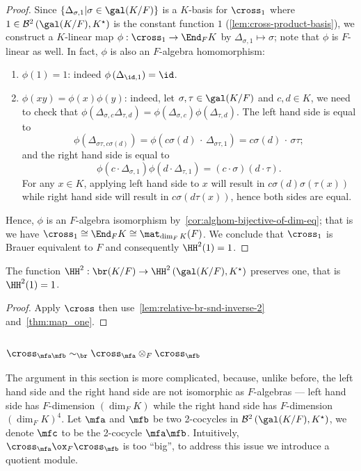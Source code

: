 \begin{proof}
  Since $\{\Delta_{\sigma, 1}|\sigma\in\gal(K/F)\}$ is a $K$-basis for $\cross_{1}$ where $1 \in \mathcal{B}^{2}\left(\gal(K/F),K^{\star}\right)$ is the constant function $1$ (\cref{lem:cross-product-basis}), we construct a $K$-linear map $\phi : \cross_{1} \to \End_{F} K$ by $\Delta_{\sigma, 1} \mapsto \sigma$; note that $\phi$ is $F$-linear as well. In fact, $\phi$ is also an $F$-algebra homomorphism:
  \begin{enumerate}
    \item $\phi(1) = 1$: indeed $\phi\left(\Delta_{\id,1}\right) = \id$.
    \item $\phi(xy) = \phi(x)\phi(y)$: indeed, let $\sigma,\tau\in\gal(K/F)$ and $c,d\in K$, we need to check that $\phi\left(\Delta_{\sigma,c}\Delta_{\tau,d}\right) = \phi\left(\Delta_{\sigma,c}\right)\phi\left(\Delta_{\tau,d}\right)$. The left hand side is equal to
          \[\phi\left(\Delta_{\sigma\tau,c\sigma(d)}\right) = \phi\left(c\sigma(d)\,\cdot\, \Delta_{\sigma\tau,1}\right) = c\sigma(d)\,\cdot\, \sigma\tau;\]
          and the right hand side is equal to
          \[
        \phi\left(c\cdot \Delta_{\sigma,1}\right)\phi\left(d\cdot \Delta_{\tau, 1}\right) = (c \cdot \sigma) (d \cdot \tau).
          \]
          For any $x \in K$, applying left hand side to $x$ will result in $c\sigma(d)\sigma(\tau(x))$ while right hand side will result in $c\sigma(d\tau(x))$, hence both sides are equal.
  \end{enumerate}
  Hence, $\phi$ is an $F$-algebra isomorphism by~\cref{cor:alghom-bijective-of-dim-eq}; that is we have $\cross_{1} \cong \End_{F}K \cong\mat_{\dim_{F}K}(F)$. We conclude that $\cross_{1}$ is Brauer equivalent to $F$ and consequently $\HH^{2}(1) = 1$.
\end{proof}


\begin{corollary}
  The function $\HH^{2}:\br(K/F) \to \HH^{2}\left(\gal(K/F), K^{\star}\right)$ preserves one, that is $\HH^{2}(1) = 1$.
  \leanok
\end{corollary}
\begin{proof}
  Apply $\cross$ then use~\cref{lem:relative-br-snd-inverse-2} and~\cref{thm:map_one}.
\end{proof}

\subsubsection{$\cross_{\mfa\mfb}\sim_{\br}\cross_{\mfa}\otimes_{F}\cross_{\mfb}$}
The argument in this section is more complicated, because, unlike before, the left hand side and the right hand side are not isomorphic as $F$-algebras --- left hand side has $F$-dimension $\left(\dim_{F}K\right)$ while the right hand side has $F$-dimension $\left(\dim_{F}K\right)^{4}$. Let $\mfa$ and $\mfb$ be two 2-cocycles in $\mathcal{B}^{2}\left(\gal(K/F), K^{\star}\right)$, we denote $\mfc$ to be the 2-cocycle $\mfa \mfb$. Intuitively, $\cross_{\mfa} \ox_{F} \cross_{\mfb}$ is too ``big'', to address this issue we introduce a quotient module.

